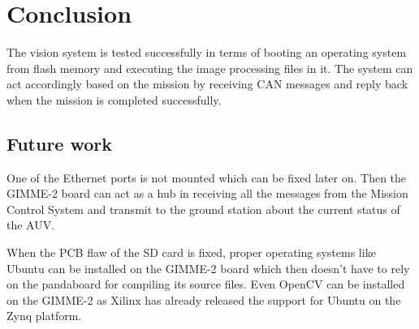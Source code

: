 \section{Conclusion}\label{sec:conclusion}
The vision system is tested successfully in terms of booting an operating system from flash memory and executing the image processing files in it. The system can act accordingly based on the mission by receiving CAN messages and reply back when the mission is completed successfully.


\subsection{Future work}
One of the Ethernet ports is not mounted which can be fixed later on. Then the GIMME-2 board can act as a hub in receiving all the messages from the Mission Control System and transmit to the ground station about the current status of the AUV. 

When the PCB flaw of the SD card is fixed, proper operating systems like Ubuntu can be installed on the GIMME-2 board \cite{ubuntuZynq} which then doesn't have to rely on the pandaboard for compiling its source files. Even OpenCV can be installed on the GIMME-2 as Xilinx has already released the support for Ubuntu on the Zynq platform.

